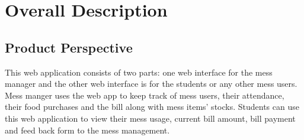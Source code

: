 \documentclass{scrreprt}
\begin{document}
\chapter{Overall Description}

\section{Product Perspective}
This web application consists of two parts: one web interface for the mess manager and the other web interface is for the students or any other mess users. Mess manger uses the web app to keep track of mess users, their attendance, their food purchases and the bill along with mess items’ stocks. Students can use this web application to view their mess usage, current bill amount, bill payment and feed back form to the mess management. 
\end{document}
